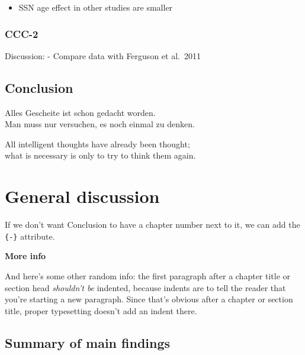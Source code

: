 \documentclass[a4paper, twoside]{templates/ociamthesis}
\providecommand{\tightlist}{%
  \setlength{\itemsep}{0pt}\setlength{\parskip}{0pt}}
\begin{document}
\begin{itemize}
\tightlist
\item
  SSN age effect in other studies are smaller
\end{itemize}

\hypertarget{ccc-2-1}{%
\subsection{CCC-2}\label{ccc-2-1}}

Discussion: - Compare data with Ferguson et al.~2011

\hypertarget{conclusion-2}{%
\section{Conclusion}\label{conclusion-2}}

\clearpage

\begin{savequote}
Alles Gescheite ist schon gedacht worden.\\
Man muss nur versuchen, es noch einmal zu denken.

All intelligent thoughts have already been thought;\\
what is necessary is only to try to think them again.
\end{savequote}



\hypertarget{general-discussion}{%
\chapter*{General discussion}\label{general-discussion}}

If we don't want Conclusion to have a chapter number next to it, we can add the \texttt{\{-\}} attribute.

\textbf{More info}

And here's some other random info: the first paragraph after a chapter title or section head \emph{shouldn't be} indented, because indents are to tell the reader that you're starting a new paragraph. Since that's obvious after a chapter or section title, proper typesetting doesn't add an indent there.

\hypertarget{summary-of-main-findings}{%
\section*{Summary of main findings}\label{summary-of-main-findings}}
\end{document}
